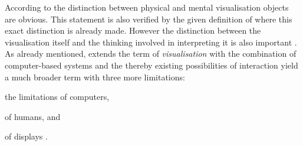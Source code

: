 According to \citeauthor{Phillips2010} the distinction between physical and mental visualisation objects are obvious. This statement is also verified by the given definition of \citeauthor{mccormick:1987} where this exact distinction is already made. However the distinction between the visualisation itself and the thinking involved in interpreting it is also important . As already mentioned, \citeauthor{Munzner2014} extends the term of \textit{visualisation} with the combination of computer-based systems and the thereby existing possibilities of interaction yield a much broader term with three more limitations:
\begin{enumerate*}[label={(\arabic*)}]
\item the limitations of computers,
\item of humans, and
\item of displays .
\end{enumerate*}

\cbend